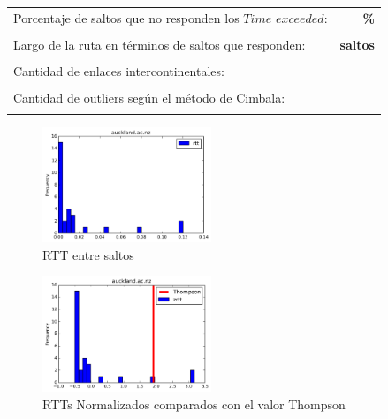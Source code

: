 \begin{center}
\begin{tabular}{p{6.5cm}r}
Porcentaje de saltos que no responden los $Time$ $exceeded$: & \textbf{\%} \\ \\ 
Largo de la ruta en términos de saltos que responden: &\textbf{ saltos} \\ \\
Cantidad de enlaces intercontinentales: & \textbf{} \\ \\
Cantidad de outliers según el método de Cimbala: & \textbf{} \\ \\
\end{tabular}
\end{center}

\begin{figure}[H]
  \centering
    \includegraphics[width=0.45\textwidth]{histogramas_rtt/auckland-ac-nz.png}
  \caption{RTT entre saltos}
  \label{entropia-s}
\end{figure}

\begin{center}

\end{center}

\begin{figure}[H]
  \centering
    \includegraphics[width=0.45\textwidth]{histogramas_thompson/auckland-ac-nz.png}
  \caption{RTTs Normalizados comparados con el valor Thompson}
  \label{entropia-s}
\end{figure}

